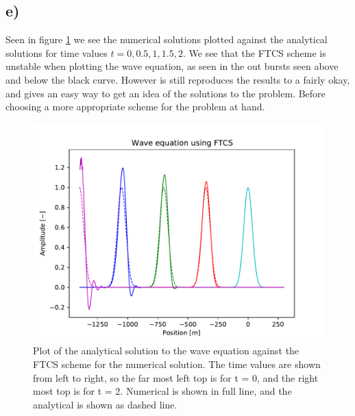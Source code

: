 \documentclass[10pt, a4paper]{amsart}
\begin{document}
\subsection{e)}
Seen in figure \ref{fig:1e} we see the numerical solutions plotted against the analytical solutions for time values $t = 0,0.5,1,1.5,2$. We see that the FTCS scheme is unstable when plotting the wave equation, as seen in the out bursts seen above and below the black curve. However is still reproduces the results to a fairly okay, and gives an easy way to get an idea of the solutions to the problem. Before choosing a more appropriate scheme for the problem at hand. 
\begin{figure}[h]
\centering
\includegraphics[width=0.9\linewidth]{"../code/FTCS.pdf"}
\caption{Plot of the analytical solution to the wave equation against the FTCS scheme for the numerical solution. The time values are shown from left to right, so the far most left top is for t = 0, and the right most top is for t = 2. Numerical is shown in full line, and the analytical is shown as dashed line.}
\label{fig:1e}
\end{figure}
\end{document}
